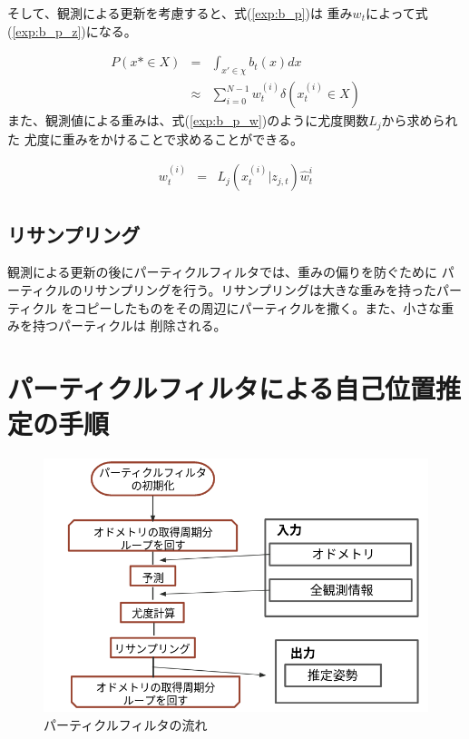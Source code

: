 そして、観測による更新を考慮すると、式(\ref{exp:b_p})は
重み$w_t$によって式(\ref{exp:b_p_z})になる。

\begin{eqnarray}
  \label{exp:b_p_z}
  P(x*\in X) &=& \int_{x'\in\chi}b_t(x)dx \nonumber \\
  &\approx& \sum_{i=0}^{N-1} w^{(i)}_{t} \delta (x^{(i)}_{t} \in X)
\end{eqnarray}
また、観測値による重みは、式(\ref{exp:b_p_w})のように尤度関数$L_j$から求められた
尤度に重みをかけることで求めることができる。

\begin{eqnarray}
  \label{exp:b_p_w}
  w_{t}^{(i)} &=& L_j(x_{t}^{(i)} | z_{j, t})\hat{w}_{t}^{i}
\end{eqnarray}

\subsection{リサンプリング}

観測による更新の後にパーティクルフィルタでは、重みの偏りを防ぐために
パーティクルのリサンプリングを行う。リサンプリングは大きな重みを持ったパーティクル
をコピーしたものをその周辺にパーティクルを撒く。また、小さな重みを持つパーティクルは
削除される。

\section{パーティクルフィルタによる自己位置推定の手順}

\begin{figure}[h]
  \begin{center}
    \includegraphics[width=1.0\linewidth]{figs/particle_filter_flow.png}
    \caption{パーティクルフィルタの流れ}
    \label{fig:particle_filter_flow}
  \end{center}
\end{figure}

